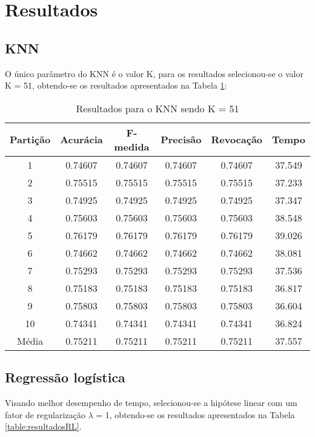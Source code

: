 \section{Resultados}

\subsection{KNN}

O único parâmetro do KNN é o valor K, para os resultados selecionou-se o valor K = 51, obtendo-se os resultados apresentados na Tabela \ref{table:resultadosKNN}:

\begin{table}[h]
\centering
\caption{Resultados para o KNN sendo K = 51}
\vspace{0.2cm}
\begin{tabular}{c|c|c|c|c|c}
Partição & Acurácia & F-medida & Precisão & Revocação & Tempo \\
\hline
1  & 0.74607 & 0.74607 & 0.74607 & 0.74607 & 37.549 \\     
2  & 0.75515 & 0.75515 & 0.75515 & 0.75515 & 37.233 \\     
3  & 0.74925 & 0.74925 & 0.74925 & 0.74925 & 37.347 \\     
4  & 0.75603 & 0.75603 & 0.75603 & 0.75603 & 38.548 \\     
5  & 0.76179 & 0.76179 & 0.76179 & 0.76179 & 39.026 \\     
6  & 0.74662 & 0.74662 & 0.74662 & 0.74662 & 38.081 \\     
7  & 0.75293 & 0.75293 & 0.75293 & 0.75293 & 37.536 \\     
8  & 0.75183 & 0.75183 & 0.75183 & 0.75183 & 36.817 \\     
9  & 0.75803 & 0.75803 & 0.75803 & 0.75803 & 36.604 \\     
10 & 0.74341 & 0.74341 & 0.74341 & 0.74341 & 36.824 \\
\hline
Média & 0.75211 & 0.75211 & 0.75211 & 0.75211 & 37.557

\end{tabular} 
\label{table:resultadosKNN}
\end{table}

\subsection{Regressão logística}

Visando melhor desempenho de tempo, selecionou-se a hipótese linear com um fator de regularização \(\lambda\)  = 1, obtendo-se os resultados apresentados na Tabela \ref{table:resultadosRL}.


